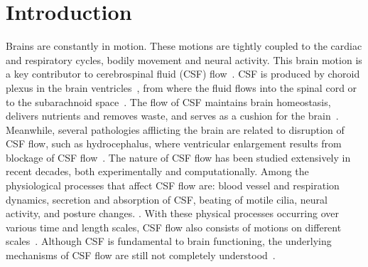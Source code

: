 \documentclass{template}
\begin{document}
\section{Introduction}
Brains are constantly in motion. These motions are tightly coupled
to the cardiac and respiratory cycles, bodily movement and
neural activity. This brain motion is a key contributor to
cerebrospinal fluid (CSF) flow~\cite{Enzmann1992BrainImaging,
baledent2001cerebrospinal, sweetman2011cerebrospinal}.
CSF is produced by choroid plexus in the brain ventricles~\cite{Damkier2013},
from where the fluid flows into the spinal cord or
to the subarachnoid space~\cite{rasmussen2018glymphatic}.
The flow of CSF maintains brain homeostasis,
delivers nutrients and removes waste, and
serves as a cushion for the brain~\cite{fame2020emergence,
kelley2023cerebrospinal, linninger2016cerebrospinal}.
Meanwhile, several pathologies afflicting the brain
are related to disruption of CSF flow,
such as hydrocephalus, where ventricular enlargement
results from blockage of CSF flow~\cite{linninger2016cerebrospinal}.
The nature of CSF flow has been studied extensively
in recent decades, both experimentally and computationally.
Among the physiological processes that affect CSF flow are:
blood vessel and respiration dynamics,
secretion and absorption of CSF,
beating of motile cilia, neural activity, and posture changes.
\cite{kelley2023cerebrospinal, sweetman2011cerebrospinal,
Olstad2019CiliaryDevelopment, Faubel2016CiliaVentricles,
Kurtcuoglu2007ComputationalSylvius, Czosnyka2004CerebrospinalDynamics,
Vinje2019RespiratoryMeasurements, Liu2024UsingBreathing,
baledent2001cerebrospinal}.
With these physical processes occurring
over various time and length scales, CSF flow
also consists of motions on different
scales~\cite{kelley2023cerebrospinal}.
Although CSF is fundamental to brain functioning,
the underlying mechanisms of CSF flow are still not
completely understood~\cite{kelley2023cerebrospinal}.
\end{document}
